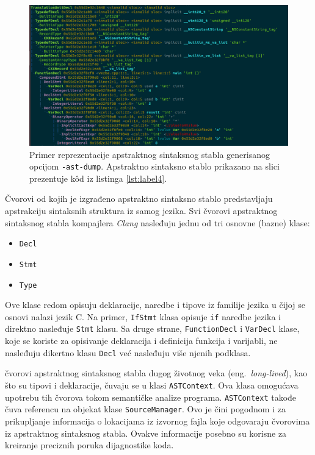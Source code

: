 \documentclass[12pt,oneside]{memoir}
\begin{document}
\begin{figure}[!ht]
  \centering
  \includegraphics[width=1.0\textwidth]{ASTImage.png}
  \caption{Primer reprezentacije apstraktnog sintaksnog stabla generisanog opcijom \texttt{-ast-dump}. Apstraktno sintaksno stablo prikazano na slici prezentuje k\^{o}d iz listinga \ref{lst:label4}.}
  \label{fig:ASTSlika}
\end{figure}

\v{C}vorovi od kojih je izgrađeno apstraktno sintaksno stablo predstavljaju apstrakciju sintaksnih struktura iz samog jezika.
Svi \v{c}vorovi apstraktnog sintaksnog stabla kompajlera \textit{Clang} nasleđuju jednu od tri osnovne (bazne) klase:
\begin{itemize}
  \item \texttt{Decl}
  \item \texttt{Stmt}
  \item \texttt{Type}
\end{itemize}
Ove klase redom opisuju deklaracije, naredbe i tipove iz familije jezika u \v{c}ijoj se osnovi nalazi jezik C.
Na primer, \texttt{IfStmt} klasa opisuje \texttt{if} naredbe jezika i direktno nasleđuje \texttt{Stmt} klasu. Sa druge strane, \texttt{FunctionDecl} i \texttt{VarDecl} klase, koje se koriste za opisivanje deklaracija i definicija funkcija i varijabli, ne nasleđuju dikertno klasu \texttt{Decl} ve\'{c} nasleđuju vi\v{s}e njenih podklasa.
\par
\v{c}vorovi apstraktnog sintaksnog stabla dugog \v{z}ivotnog veka (eng.~\textit{long-lived}), kao \v{s}to su tipovi i deklaracije, \v{c}uvaju se u klasi \texttt{ASTContext}. Ova klasa
omogu\'{c}ava upotrebu tih \v{c}vorova tokom semanti\v{c}ke analize programa. \texttt{ASTContext} takođe \v{c}uva referencu na objekat klase \texttt{SourceManager}. Ovo je
\v{c}ini pogodnom i za prikupljanje informacija o lokacijama iz izvornog fajla koje odgovaraju \v{c}vorovima iz apstraktnog sintaksnog stabla. Ovakve informacije posebno su korisne za kreiranje
preciznih poruka dijagnostike koda.
\end{document}
